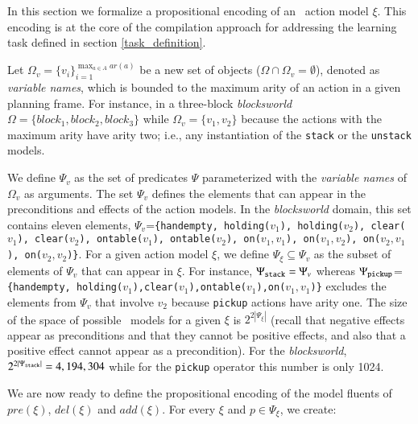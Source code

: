 In this section we formalize a propositional encoding of an \strips\ action model $\xi$. This encoding is at the core of the \FAMA compilation approach for addressing the learning task defined in section \ref{task_definition}.

Let $\Omega_v=\{v_i\}_{i=1}^{\operatorname*{max}_{a\in A} ar(a)}$ be a new set of objects ($\Omega\cap\Omega_v=\emptyset$), denoted as {\em variable names}, which is bounded to the maximum arity of an action in a given planning frame. For instance, in a three-block {\em blocksworld} $\Omega=\{block_1, block_2, block_3\}$ while $\Omega_v=\{v_1,v_2\}$ because the actions with the maximum arity have arity two; i.e., any instantiation of the {\small\tt stack} or the {\small\tt unstack} models.

We define $\Psi_v$ as the set of predicates $\Psi$ parameterized with the {\em variable names} of $\Omega_v$ as arguments. The set $\Psi_v$  defines the elements that can appear in the preconditions and effects of the action models. In the {\em blocksworld} domain, this set contains eleven elements, $\Psi_v$={\small\tt\{handempty, holding($v_1$), holding($v_2$), clear($v_1$), clear($v_2$), ontable($v_1$), ontable($v_2$), on($v_1,v_1$), on($v_1,v_2$), on($v_2,v_1$), on($v_2,v_2$)\}}. For a given action model $\xi$, we define $\Psi_{\xi}\subseteq \Psi_v$ as the subset of elements of $\Psi_v$ that can appear in $\xi$. For instance, $\Psi_{\tt stack}=\Psi_v$ whereas $\Psi_{\tt pickup}$={\small\tt\{handempty, holding($v_1$),clear($v_1$),ontable($v_1$),on($v_1,v_1$)\}} excludes the elements from $\Psi_v$ that involve $v_2$ because {\small\tt pickup} actions have arity one. The size of the space of possible \strips\ models for a given $\xi$ is $2^{2|\Psi_{\xi}|}$ (recall that negative effects appear as preconditions and that they cannot be positive effects, and also that a positive effect cannot appear as a precondition). For the {\em blocksworld}, $2^{2|\Psi_{\tt stack}|}=4,194,304$ while for the {\tt pickup} operator this number is only 1024.

We are now ready to define the propositional encoding of the \textcolor[rgb]{1.00,0.00,0.00}{model fluents} of $pre(\xi)$, $del(\xi)$ and $add(\xi)$. For every $\xi$ and $p\in \Psi_{\xi}$, we create:

